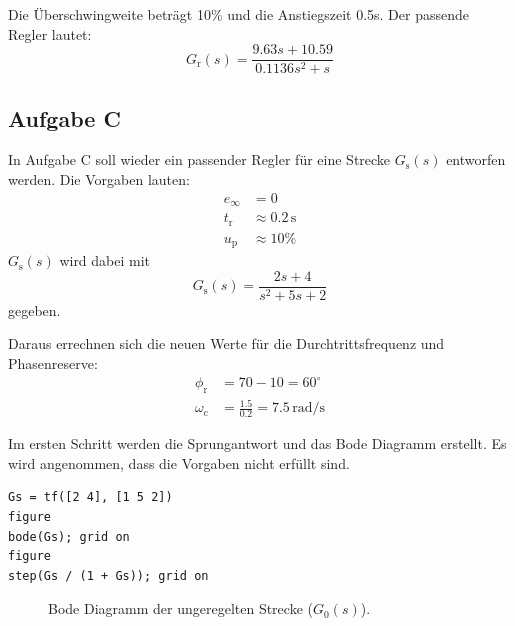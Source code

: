 \documentclass[11pt,a4paper]{article}
\newlength\figureheight
\newlength\figurewidth
\begin{document}
\noindent Die Überschwingweite beträgt 10\% und die Anstiegszeit 0.5s. Der passende Regler lautet:
$$G_{\mathrm{r}}(s) = \frac{9.63s + 10.59}{0.1136s^2 + s}$$

\subsection{Aufgabe C}

\noindent In Aufgabe C soll wieder ein passender Regler für eine Strecke $G_{\mathrm{s}}(s)$ entworfen werden. Die Vorgaben lauten:
\begin{equation}
\begin{aligned}
    e_{\infty} &= 0 \\
    t_{\mathrm{r}} &\approx 0.2\,\text{s} \\
    u_{\mathrm{p}} &\approx 10\%
\end{aligned}
\end{equation}
$G_{\mathrm{s}}(s)$ wird dabei mit $$G_{\mathrm{s}}(s) = \frac{2s + 4}{s^2 + 5s + 2}$$ gegeben.

\noindent Daraus errechnen sich die neuen Werte für die Durchtrittsfrequenz und Phasenreserve:
\begin{equation}
\begin{aligned}
    \phi_{\mathrm{r}} &= 70 - 10 = 60^{\circ} \\[1.5ex]
    \omega_{\mathrm{c}} &= \frac{1.5}{0.2} = 7.5\,\text{rad/s}
\end{aligned}
\end{equation}

\noindent Im ersten Schritt werden die Sprungantwort und das Bode Diagramm erstellt. Es wird angenommen, dass die Vorgaben nicht erfüllt sind.

\begin{lstlisting}
Gs = tf([2 4], [1 5 2])
figure
bode(Gs); grid on
figure
step(Gs / (1 + Gs)); grid on
\end{lstlisting}

\begin{figure}[H]
    \centering
    \setlength\figureheight{6cm}
    \setlength{} %
    
    
    
    \caption{Bode Diagramm der ungeregelten Strecke ($G_{\mathrm{0}}(s)$).}
    \label{fig:matlab_plot14}
\end{figure}
\end{document}
